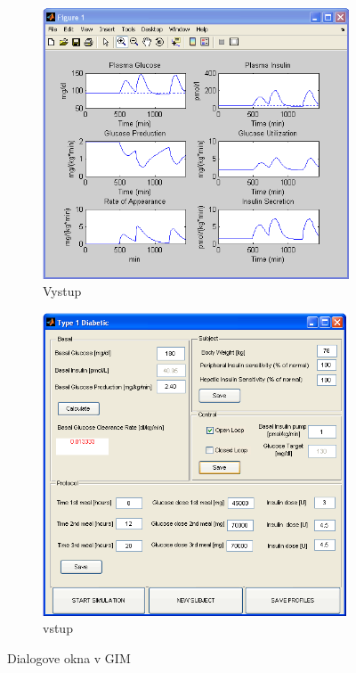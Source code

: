 \begin{figure}[H]
\centering
 \begin{subfigure}[b]{0.475\linewidth}
   \includegraphics[width=\linewidth]{ob-3.PNG}
   \caption{Vystup}
 \end{subfigure}
 \begin{subfigure}[b]{0.475\linewidth}
   \includegraphics[width=\linewidth]{ob-4.PNG}
   \caption{vstup}
 \end{subfigure}
\caption{Dialogove okna v GIM \cite{2007}}
\label{okna}
\end{figure}

